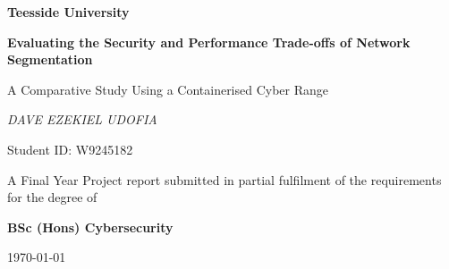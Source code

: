 \documentclass[12pt,a4paper,oneside]{report}
\begin{document}
\begin{titlepage}
    \centering
    \vspace*{1.5cm}
    {\Large \textbf{Teesside University}\par}
    \vspace{0.5cm}

    {\Huge\bfseries Evaluating the Security and Performance Trade-offs of Network Segmentation\par}
    \vspace{0.5cm}
    {\Large A Comparative Study Using a Containerised Cyber Range\par}
    \vspace{2.5cm}

    {\Large\itshape DAVE EZEKIEL UDOFIA\par}
    \vspace{0.4cm}
    {\large Student ID: W9245182\par}
    \vspace{2cm}

    {\large A Final Year Project report submitted in partial fulfilment of the requirements for the degree of\par}
    \vspace{0.3cm}
    {\large\bfseries BSc (Hons) Cybersecurity\par}
    \vspace{1cm}
    {\large \today\par}
\end{titlepage}





\tableofcontents
\listoffigures
\listoftables











\appendix





\end{document}
